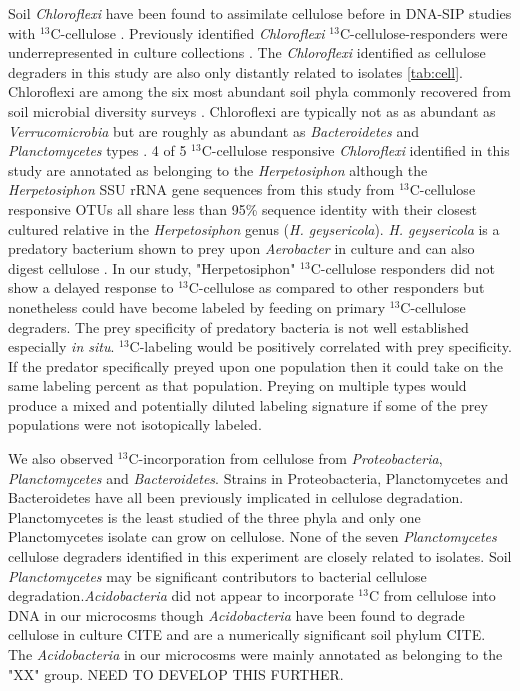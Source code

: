 Soil \textit{Chloroflexi} have been found to assimilate cellulose before in
DNA-SIP studies with $^{13}$C-cellulose \citep{Schellenberger_2010}. Previously
identified \textit{Chloroflexi} $^{13}$C-cellulose-responders were
underrepresented in culture collections \citep{Schellenberger_2010}.  The
\textit{Chloroflexi} identified as cellulose degraders in this study are also
only distantly related to isolates \ref{tab:cell}.  Chloroflexi are among the
six most abundant soil phyla commonly recovered from soil microbial diversity
surveys \citep{Janssen2006}. Chloroflexi are typically not as as abundant as
\textit{Verrucomicrobia} but are roughly as abundant as \textit{Bacteroidetes}
and \textit{Planctomycetes} types \citep{Janssen2006}.  4 of 5
$^{13}$C-cellulose responsive \textit{Chloroflexi} identified in this study are
annotated as belonging to the \textit{Herpetosiphon} although the
\textit{Herpetosiphon} SSU rRNA gene sequences from this study from 
$^{13}$C-cellulose responsive OTUs all share less
than 95\% sequence identity with their
closest cultured relative in the \textit{Herpetosiphon} genus (\textit{H.
    geysericola}). \textit{H. geysericola} is a predatory bacterium shown to
prey upon \textit{Aerobacter} in culture and can also digest cellulose
\citep{Lewin1970}. In our study, "Herpetosiphon" $^{13}$C-cellulose responders
did not show a delayed response to $^{13}$C-cellulose as compared to other
responders but nonetheless could have
become labeled by feeding on primary $^{13}$C-cellulose degraders. The prey
specificity of predatory bacteria is not well established especially \textit{in
    situ}. $^{13}$C-labeling would be positively correlated with prey
specificity. If the predator specifically preyed upon one population then it
could take on the same labeling percent as that population. Preying on multiple
types would produce a mixed and potentially diluted labeling signature if some
of the prey populations were not isotopically labeled.

We also observed $^{13}$C-incorporation from cellulose from
\textit{Proteobacteria}, \textit{Planctomycetes} and \textit{Bacteroidetes}. 
Strains in Proteobacteria, Planctomycetes and Bacteroidetes have all been
previously implicated in cellulose degradation. Planctomycetes is the
least studied of the three phyla and only one Planctomycetes isolate can
grow on cellulose. None of the seven \textit{Planctomycetes} cellulose degraders
identified in  this experiment are closely related to isolates. Soil
\textit{Planctomycetes} may be significant contributors to bacterial cellulose 
degradation.\textit{Acidobacteria} did not appear to incorporate $^{13}$C
from cellulose into DNA in
our microcosms though \textit{Acidobacteria} have been found to degrade
cellulose in culture CITE and are a numerically significant soil phylum CITE.
The \textit{Acidobacteria} in our microcosms were mainly annotated as belonging
to the "XX" group. NEED TO DEVELOP THIS FURTHER.

